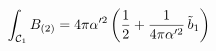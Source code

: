 \begin{equation}
\label{bfl1}
\int_{{\cal C}_1} B_{(2)} = 4 \pi \alpha'^2 \left(\frac{1}{2} +
\frac{1}{4 \pi \alpha'^2} \,\tilde b_1\right)
\end{equation}

